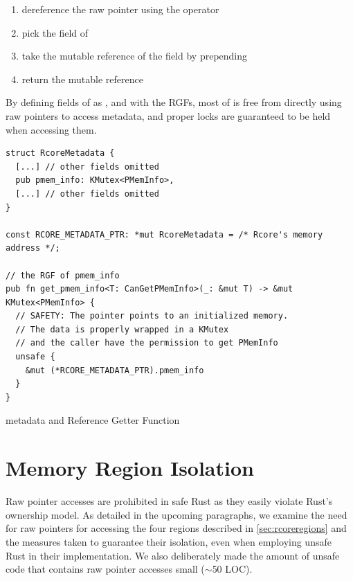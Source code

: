 \begin{enumerate}
  \item dereference the raw pointer using the \code{*} operator
  \item pick the  field of 
  \item take the mutable reference of the field by prepending 
  \item return the mutable reference
\end{enumerate}

By defining fields of  as , and with
the RGFs, most of \rustcore{} is free from directly using raw pointers to access
\rustcore{} metadata, and proper locks are guaranteed to be held when accessing
them.

\begin{listing}[ht]
    \begin{verbatim}
struct RcoreMetadata {
  [...] // other fields omitted
  pub pmem_info: KMutex<PMemInfo>,
  [...] // other fields omitted
}

const RCORE_METADATA_PTR: *mut RcoreMetadata = /* Rcore's memory address */;

// the RGF of pmem_info
pub fn get_pmem_info<T: CanGetPMemInfo>(_: &mut T) -> &mut KMutex<PMemInfo> {
  // SAFETY: The pointer points to an initialized memory.
  // The data is properly wrapped in a KMutex
  // and the caller have the permission to get PMemInfo
  unsafe {
    &mut (*RCORE_METADATA_PTR).pmem_info
  }
}
    \end{verbatim}
    \caption{\rustcore{} metadata and Reference Getter Function}
    \label{lst:getternew}
    \vspace{-0.2cm}
\end{listing}

\section{Memory Region Isolation}

Raw pointer accesses are prohibited in safe Rust as they easily violate Rust’s
ownership model. As detailed in the upcoming paragraphs, we examine the need
for raw pointers for accessing the four regions described in \autoref{sec:rcoreregions}
and the measures taken to guarantee their isolation,
even when employing unsafe Rust in their implementation.
We also deliberately made the
amount of unsafe code that contains raw pointer accesses small ($\sim$50 LOC).

